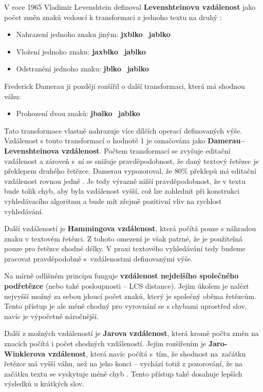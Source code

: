 \documentclass[FM,DP]{tulthesis}
\begin{document}
V roce 1965 Vladimir Levenshtein definoval \textbf{Levenshteinovu vzdálenost} jako počet
změn znaků vedoucí k transformaci z jednoho textu na druhý \cite{es-fuzziness}:

\begin{itemize}
\item Nahrazení jednoho znaku jiným: \textbf{jxblko} \textrightarrow ~\textbf{jablko}
\item Vložení jednoho znaku: \textbf{jaxblko} \textrightarrow ~\textbf{jablko}
\item Odstranění jednoho znaku: \textbf{jblko} \textrightarrow ~\textbf{jablko}
\end{itemize}

Frederick Damerau ji později rozšířil o další transformaci, která má shodnou váhu:

\begin{itemize}
\item Prohození dvou znaků: \textbf{jbalko} \textrightarrow ~\textbf{jablko}
\end{itemize}

Tato transformace vlastně nahrazuje více dílčích operací definovaných výše. 
Vzdálenost s touto transformací o hodnotě 1 je označována jako 
\textbf{Damerau–Levenshteinova vzdálenost}. 
Počtem transformací se zvyšuje editační vzdálenost a zároveň
s~ní se snižuje pravděpodobnost, že daný textový řetězec je překlepem
druhého řetězce. Damerau vypozoroval, že 80\% překlepů má editační vzdálenost 
rovnou jedné \cite{damerau}. Je tedy výrazně nižší pravděpodobnost, že 
v textu bude tolik chyb, aby byla vzdálenost vyšší, což lze zohlednit při konstrukci
vyhledávacího algoritmu a bude mít zřejmě pozitivní vliv na rychlost vyhledávání.

Další vzdáleností je \textbf{Hammingova vzdálenost}, která počítá pouze s náhradou
znaku v textovém řetězci. Z tohoto omezení je však patrné, že je použitelná pouze pro 
řetězce shodné délky. V praxi textového vyhledávání tedy budeme pracovat pravděpodobně
s~vzdálenostmi definovanými výše.

Na mírně odlišném principu funguje \textbf{vzdálenost nejdelšího společného podřetězce}
(nebo také posloupnosti -- LCS distance). Jejím úkolem je nalézt nejvyšší možný za sebou
jdoucí počet znaků, který je společný oběma řetězcům. Tento přístup je ale méně
chodný pro vyrovnání se s chybami uprostřed slov, navíc je výpočetně náročnější.

Další z možných vzdáleností je \textbf{Jarova vzdálenost}, která kromě počtu
změn na znacích počítá i počet shodných vzdáleností. Jejím rozšířením je
\textbf{Jaro-Winklerova vzdálenost}, která navíc počítá s~tím, že shodnost 
na~začátku řetězce má vyšší váhu, než na jeho konci -- vychází
totiž z pozorování, že na začátku textu se vyskytuje méně chyb \cite{christen}.
Tento přístup také dosahuje lepších výsledků u krátkých slov.
\end{document}
